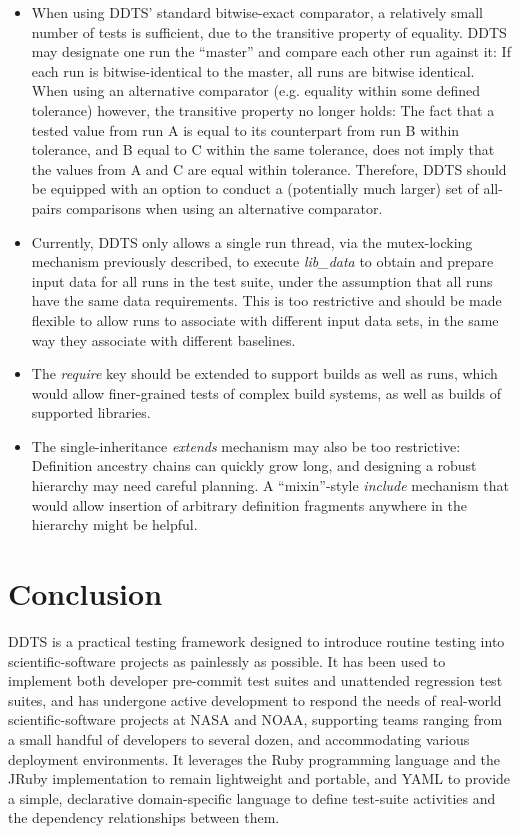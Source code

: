 \documentclass[conference]{IEEEtran}
\begin{document}
\begin{itemize}
\item When using DDTS' standard bitwise-exact comparator, a relatively small number of tests is sufficient, due to the transitive property of equality. DDTS may designate one run the ``master'' and compare each other run against it: If each run is bitwise-identical to the master, all runs are bitwise identical. When using an alternative comparator (e.g. equality within some defined tolerance) however, the transitive property no longer holds: The fact that a tested value from run A is equal to its counterpart from run B within tolerance, and B equal to C within the same tolerance, does not imply that the values from A and C are equal within tolerance. Therefore, DDTS should be equipped with an option to conduct a (potentially much larger) set of all-pairs comparisons when using an alternative comparator.
\item Currently, DDTS only allows a single run thread, via the mutex-locking mechanism previously described, to execute \emph{lib\_data} to obtain and prepare input data for all runs in the test suite, under the assumption that all runs have the same data requirements. This is too restrictive and should be made flexible to allow runs to associate with different input data sets, in the same way they associate with different baselines.
\item The \emph{require} key should be extended to support builds as well as runs, which would allow finer-grained tests of complex build systems, as well as builds of supported libraries.
\item The single-inheritance \emph{extends} mechanism may also be too restrictive: Definition ancestry chains can quickly grow long, and designing a robust hierarchy may need careful planning. A ``mixin''-style \emph{include} mechanism that would allow insertion of arbitrary definition fragments anywhere in the hierarchy might be helpful.
\end{itemize}

\section{Conclusion}

DDTS is a practical testing framework designed to introduce routine testing into scientific-software projects as painlessly as possible. It has been used to implement both developer pre-commit test suites and unattended regression test suites, and has undergone active development to respond the needs of real-world scientific-software projects at NASA and NOAA, supporting teams ranging from a small handful of developers to several dozen, and accommodating various deployment environments. It leverages the Ruby programming language and the JRuby implementation to remain lightweight and portable, and YAML to provide a simple, declarative domain-specific language to define test-suite activities and the dependency relationships between them.
\end{document}
